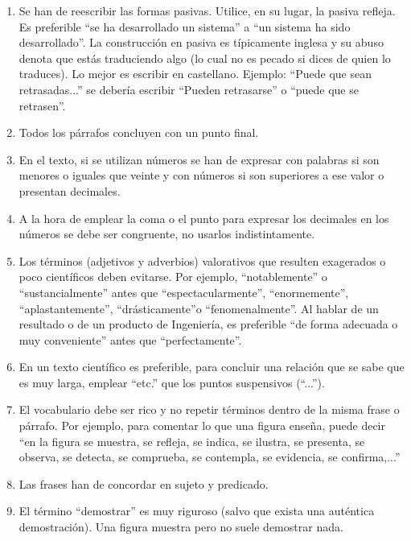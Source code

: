\begin{enumerate}
\item Se han de reescribir   las  formas pasivas.  Utilice,  en  su  lugar,  la  pasiva  refleja.  Es preferible “se ha desarrollado un sistema” a “un sistema ha sido desarrollado”. La construcción en pasiva es típicamente inglesa y su abuso denota que estás traduciendo algo (lo cual no es pecado si dices de quien lo traduces). Lo mejor es escribir en castellano. Ejemplo: “Puede  que  sean  retrasadas...”    se  debería  escribir  “Pueden  retrasarse”  o  “puede  que  se retrasen”.

\item Todos los párrafos concluyen con un punto final.

\item En  el  texto,  si se utilizan números se han de expresar   con  palabras   si  son  menores  o  iguales  que veinte y con números si son superiores a ese valor o presentan decimales.

\item A  la  hora  de  emplear  la  coma  o  el  punto  para  expresar  los decimales en los números se debe ser congruente, no usarlos indistintamente.

\item  Los términos  (adjetivos  y  adverbios)  valorativos  que  resulten  exagerados  o poco científicos deben evitarse. Por ejemplo,  “notablemente” o “sustancialmente” antes que “espectacularmente”, “enormemente”, “aplastantemente”, “drásticamente”o “fenomenalmente”. Al hablar de un resultado  o  de  un  producto  de  Ingeniería, es preferible “de forma adecuada o muy conveniente” antes que “perfectamente”.

\item En un texto científico es preferible, para concluir una relación que se sabe que es muy larga, emplear “etc.” que los puntos suspensivos (“...”).

\item El  vocabulario debe ser rico y no repetir términos dentro de la misma frase o  párrafo.  Por  ejemplo,  para comentar  lo  que  una  figura  enseña,  puede  decir “en  la  figura  se  muestra,  se  refleja,  se  indica,  se  ilustra,  se  presenta,  se observa, se detecta, se comprueba, se contempla, se evidencia, se confirma,...”

\item Las  frases han de concordar en  sujeto y predicado.

\item  El término “demostrar” es muy riguroso (salvo  que  exista  una  auténtica demostración). Una figura muestra pero no suele demostrar nada.


\end{enumerate}
